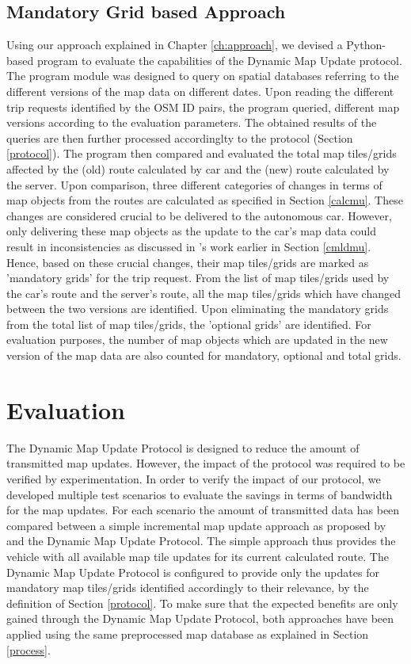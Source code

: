 \section{Mandatory Grid based Approach} \label{methodofapproach}
Using our approach explained in Chapter \ref{ch:approach}, we devised a Python-based program to evaluate the capabilities of the Dynamic Map Update protocol. The program module was designed to query on spatial databases referring to the different versions of the map data on different dates. Upon reading the different trip requests identified by the OSM ID pairs, the program queried, different map versions according to the evaluation parameters. The obtained results of the queries are then further processed accordinglty to the protocol (Section \ref{protocol}). The program then compared and evaluated the total map tiles/grids affected by the (old) route calculated by car and the (new) route calculated by the server. Upon comparison, three different categories of changes in terms of map objects from the routes are calculated as specified in Section \ref{calcmu}. These changes are considered crucial to be delivered to the autonomous car. However, only delivering these map objects as the update to the car's map data could result in inconsistencies as discussed in \citet{asahara2008locally}'s work earlier in Section \ref{cmldmu}. Hence, based on these crucial changes, their map tiles/grids are marked as 'mandatory grids' for the trip request. From the list of map tiles/grids used by the car's route and the server's route, all the map tiles/grids which have changed between the two versions are identified. Upon eliminating the mandatory grids from the total list of map tiles/grids, the 'optional grids' are identified. For evaluation purposes, the number of map objects which are updated in the new version of the map data are also counted for mandatory, optional and total grids.



\chapter{Evaluation}\label{ch:evaluation}
The Dynamic Map Update Protocol is designed to reduce the amount of transmitted map updates. However, the impact of the protocol was required to be verified by experimentation. In order to verify the impact of our protocol, we developed multiple test scenarios to evaluate the savings in terms of bandwidth for the map updates. For each scenario the amount of transmitted data has been compared between a simple incremental map update approach as proposed by \citet{bastiaensen2003actmap} and the Dynamic Map Update Protocol. The simple approach thus provides the vehicle with all available map tile updates for its current calculated route. The Dynamic Map Update Protocol is configured to provide only the updates for mandatory map tiles/grids identified accordingly to their relevance, by the definition of Section \ref{protocol}. To make sure that the expected benefits are only gained through the Dynamic Map Update Protocol, both approaches have been applied using the same preprocessed map database as explained in Section \ref{process}. \\ 


